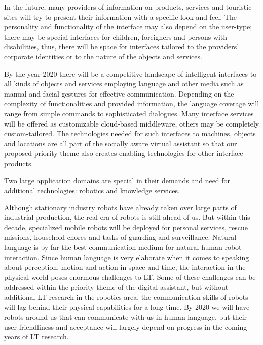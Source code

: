 \documentclass[10pt, plain]{../../metanetpaper}
\begin{document}
\begin{multicols}{2}
In the future, many providers of information on products, services and touristic sites will try to present their information with a specific look and feel. The personality and functionality of the interface may also depend on the user-type; there may be special interfaces for children, foreigners and persons with disabilities, thus, there will be space for interfaces tailored to the providers' corporate identities or to the nature of the objects and services.
 
 
By the year 2020 there will be a competitive landscape of intelligent interfaces to all kinds of objects and services employing language and other media such as manual and facial gestures for effective communication. Depending on the complexity of functionalities and provided information, the language coverage will range from simple commands to sophisticated dialogues. Many interface services will be offered as customizable cloud-based middleware, others may be completely custom-tailored. The technologies needed for such interfaces to machines, objects and locations are all part of the socially aware virtual assistant so that our proposed priority theme also creates enabling technologies for other interface products.
 
Two large application domains are special in their demands and need for additional technologies: robotics and knowledge services.
 
Although stationary industry robots have already taken over large parts of industrial production, the real era of robots is still ahead of us. But within this decade, specialized mobile robots will be deployed for personal services, rescue missions, household chores and tasks of guarding and surveillance. Natural language is by far the best communication medium for natural human-robot interaction. Since human language is very elaborate when it comes to speaking about perception, motion and action in space and time, the interaction in the physical world poses enormous challenges to LT. Some of these challenges can be addressed within the priority theme of the digital assistant, but without additional LT research in the robotics area, the communication skills of robots will lag behind their physical capabilities for a long time. By 2020 we will have robots around us that can communicate with us in human language, but their user-friendliness and acceptance will largely depend on progress in the coming years of LT research.
 

\end{multicols}
\end{document}
